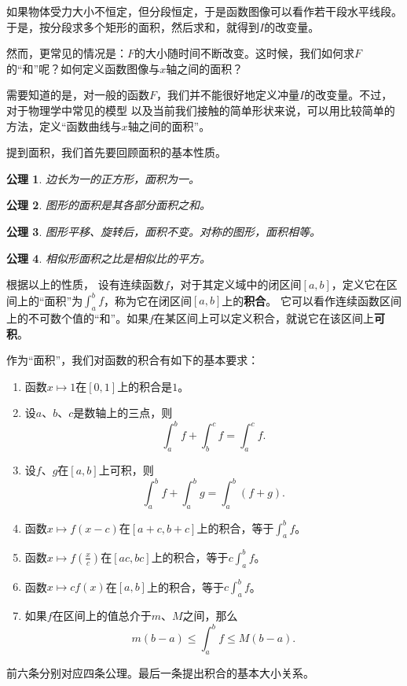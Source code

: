 \documentclass[12pt,UTF8]{ctexbook}
\newtheorem*{po}{公理}
\begin{document}
如果物体受力大小不恒定，但分段恒定，于是函数图像可以看作若干段水平线段。
于是，按分段求多个矩形的面积，然后求和，就得到$I$的改变量。

然而，更常见的情况是：$F$的大小随时间不断改变。这时候，我们如何求$F$的“和”呢？如何定义函数图像与$x$轴之间的面积？

需要知道的是，对一般的函数$F$，我们并不能很好地定义冲量$I$的改变量。不过，对于物理学中常见的模型
以及当前我们接触的简单形状来说，可以用比较简单的方法，定义“函数曲线与$x$轴之间的面积”。

提到面积，我们首先要回顾面积的基本性质。

\begin{po}
    边长为一的正方形，面积为一。
\end{po}

\begin{po}
    图形的面积是其各部分面积之和。
\end{po}

\begin{po}
    图形平移、旋转后，面积不变。对称的图形，面积相等。
\end{po}

\begin{po}
    相似形面积之比是相似比的平方。
\end{po}

根据以上的性质，
设有连续函数$f$，对于其定义域中的闭区间$[a,b]$，定义它在区间上的“面积”为$\int_a^b f$，称为它在闭区间$[a,b]$上的\textbf{积合}。
它可以看作连续函数区间上的不可数个值的“和”。如果$f$在某区间上可以定义积合，就说它在该区间上\textbf{可积}。

作为“面积”，我们对函数的积合有如下的基本要求：

\begin{enumerate}
    \item 函数$x\mapsto 1$在$[0,1]$上的积合是$1$。
    \item 设$a$、$b$、$c$是数轴上的三点，则
        $$\int_a^b f + \int_b^c f = \int_a^c f.$$
    \item 设$f$、$g$在$[a,b]$上可积，则
        $$ \int_a^b f + \int_a^b g = \int_a^b (f + g). $$
    \item 函数$x\mapsto f(x-c)$在$[a+c,b+c]$上的积合，等于$\int_a^b f$。
    \item 函数$x\mapsto f\left(\frac{x}{c}\right)$在$[ac, bc]$上的积合，等于$c\int_a^b f$。
    \item 函数$x\mapsto cf(x)$在$[a,b]$上的积合，等于$c\int_a^b f$。
    \item 如果$f$在区间上的值总介于$m$、$M$之间，那么
        $$m(b - a) \leqslant \int_a^b f \leqslant M(b - a).$$
\end{enumerate}
前六条分别对应四条公理。最后一条提出积合的基本大小关系。
\end{document}
